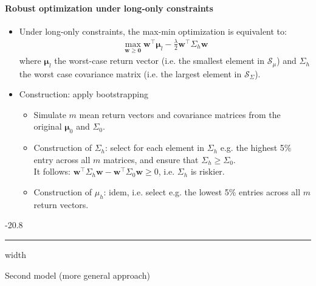 \documentclass[a4paper,landscape,8pt,fleqn]{scrartcl}
\makeatletter
\renewcommand{\subsubsection}{\@startsection{subsubsection}{1}{0mm}%
{-2\baselineskip}{0.8\baselineskip}%
{\hrule depth 0.2pt width\columnwidth\vspace*{1.2em}\normalsize\bfseries}}
\makeatother
\begin{document}
\begin{multicols*}{3}
\paragraph{Robust optimization under long-only constraints}
\begin{itemize}
\item Under long-only constraints, the max-min optimization is equivalent to:
\begin{align*}
\max_{\bm w \geq \bm 0} \bm w^\top \bm \mu_l - \frac{\lambda}{2} \bm w^\top \Sigma_h \bm w
\end{align*}
where $\bm \mu_l$ the worst-case return vector (i.e. the smallest element in $\mathcal{S}_\mu$) and $\Sigma_h$ the worst case covariance matrix (i.e. the largest element in $\mathcal{S}_\Sigma$).
\item Construction: apply bootstrapping
\begin{itemize}
\item Simulate $m$ mean return vectors and covariance matrices from the original $\bm \mu_0$ and $\Sigma_0$.
\item Construction of $\Sigma_h$: select for each element in $\Sigma_h$ e.g. the highest 5\% entry across all $m$ matrices, and ensure that $\Sigma_h \geq \Sigma_0$. \\
It follows: $\bm w^\top \Sigma_h \bm w - \bm w^\top \Sigma_0 \bm w \geq 0$, i.e. $\Sigma_h$ is riskier.
\item Construction of $\mu_h$: idem, i.e. select e.g. the lowest 5\% entries across all $m$  return vectors.
\end{itemize}
\end{itemize}

\subsubsection{Second model (more general approach)}


\end{multicols*}
\end{document}
